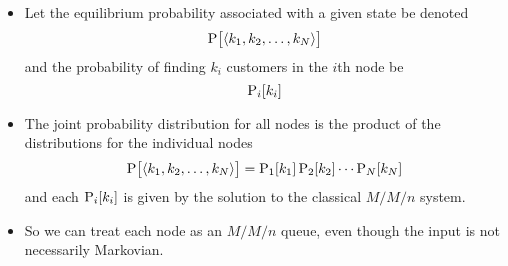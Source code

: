 \begin{itemize}[noitemsep]
\item Let the equilibrium probability associated with a given state be denoted
  \begin{equation}\label{eq:Queuing_Network_Equilibrium_Probability}
    \operatorname{\operatorname{P}} \bigl[ \langle k_{1}, k_{2}, \ldots, k_{N} \rangle \bigr]
  \end{equation}
  and the probability of finding $k_{i}$ customers in the $i$th node be
  \begin{equation*}
    \operatorname{\operatorname{P}}_{i}[k_{i}]
  \end{equation*}

\item The joint probability distribution for all nodes is the product of the distributions for the individual nodes
  \begin{equation*}
    \operatorname{\operatorname{P}} \bigl[ \langle k_{1}, k_{2}, \ldots, k_{N} \rangle \bigr] = \operatorname{\operatorname{P}}_{1}[k_{1}] \operatorname{\operatorname{P}}_{2}[k_{2}] \cdots \operatorname{\operatorname{P}}_{N}[k_{N}]
  \end{equation*}
  and each $\operatorname{\operatorname{P}}_{i}[k_{i}]$ is given by the solution to the classical $M/M/n$ system.
\item So we can treat each node as an $M/M/n$ queue, even though the input is not necessarily Markovian.

\end{itemize}

